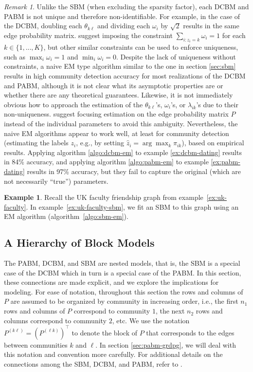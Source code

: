 \documentclass[
  12pt,
]{article}
\theoremstyle{definition}
\theoremstyle{definition}
\newtheorem{example}{Example}[section]
\theoremstyle{definition}
\theoremstyle{definition}
\theoremstyle{remark}
\newtheorem*{remark}{Remark}
\begin{document}
\begin{remark}
Unlike the SBM (when excluding the sparsity factor), each DCBM and PABM is not unique and therefore non-identifiable. 
For example, in the case of the DCBM, doubling each $\theta_{k \ell}$ and dividing each $\omega_i$ by $\sqrt{2}$ results in the same edge probability matrix. 
\citet{Karrer_2011} suggest imposing the constraint $\sum_{i : z_i = k} \omega_i = 1$ for each $k \in \{1, ..., K\}$, but other similar constraints can be used to enforce uniqueness, such as $\max_i \omega_i = 1$ and $\min_i \omega_i = 0$. 
Despite the lack of uniqueness without constraints, a naive EM type algorithm similar to the one in section \ref{sec:sbm} results in high community detection accuracy for most realizations of the DCBM and PABM, although it is not clear what its asymptotic properties are or whether there are any theoretical guarantees. 
Likewise, it is not immediately obvious how to approach the estimation of the $\theta_{k \ell}$'s, $\omega_i$'s, or $\lambda_{ik}$'s due to their non-uniqueness. 
\citet{noroozi2019estimation} suggest focusing estimation on the edge probability matrix $P$ instead of the individual parameters to avoid this ambiguity. 
Nevertheless, the naive EM algorithms appear to work well, at least for community detection (estimating the labels $z_i$, e.g., by setting $\hat{z}_i = \arg\max_k \pi_{ik}$), based on empirical results. 
Applying algorithm \ref{algo:dcbm-em} to example \ref{ex:dcbm-dating} results in 84\% accuracy, and applying algorithm \ref{algo:pabm-em} to example \ref{ex:pabm-dating} results in 97\% accuracy, but they fail to capture the original (which are not necessarily ``true'') parameters. 
\end{remark}

\begin{example}
\label{ex:uk-faculty-dcbm-pabm}
Recall the UK faculty friendship graph from example~\ref{ex:uk-faculty}. 
In example~\ref{ex:uk-faculty-sbm}, we fit an SBM to this graph using an EM algorithm (algorithm~\ref{algo:sbm-em}). 
\end{example}

\hypertarget{sec:hierarchy}{%
\subsection{A Hierarchy of Block Models}\label{sec:hierarchy}}

The PABM, DCBM, and SBM are nested models, that is, the SBM is a special case of the DCBM which in turn is a special case of the PABM.
In this section, these connections are made explicit, and we explore the implications for modeling.
For ease of notation, throughout this section the rows and columns of \(P\) are assumed to be organized by community in increasing order, i.e., the first \(n_1\) rows and columns of \(P\) correspond to community \(1\), the next \(n_2\) rows and columns correspond to community \(2\), etc.
We use the notation \(P^{(k \ell)} = (P^{(\ell k)})^\top\) to denote the block of \(P\) that corresponds to the edges between communities \(k\) and \(\ell\).
In section \ref{sec:pabm-grdpg}, we will deal with this notation and convention more carefully.
For additional details on the connections among the SBM, DCBM, and PABM, refer to \citet{Noroozi2022}.
\end{document}
